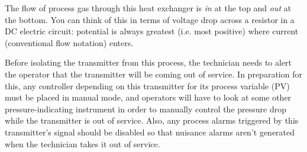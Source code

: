 \vskip 10pt

The flow of process gas through this heat exchanger is {\it in} at the top and {\it out} at the bottom.  You can think of this in terms of voltage drop across a resistor in a DC electric circuit: potential is always greatest (i.e. most positive) where current (conventional flow notation) enters.

\vskip 10pt

Before isolating the transmitter from this process, the technician needs to alert the operator that the transmitter will be coming out of service.  In preparation for this, any controller depending on this transmitter for its process variable (PV) must be placed in manual mode, and operators will have to look at some other pressure-indicating instrument in order to manually control the pressure drop while the transmitter is out of service.  Also, any process alarms triggered by this transmitter's signal should be disabled so that nuisance alarms aren't generated when the technician takes it out of service.




